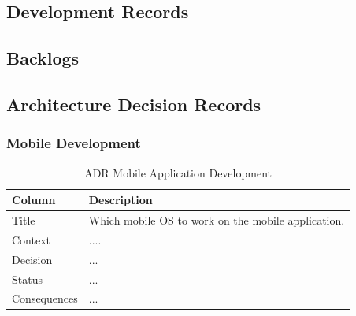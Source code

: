 \documentclass[12pt,a4paper]{article}
\begin{document}
    \begin{appendices}                  
      \section{Development Records}
        \subsection{Backlogs}\label{appendix:backlogs}
          
          
        \subsection{Architecture Decision Records}\label{appendix:Architecture Decision Records}
          \subsubsection{Mobile Development}
            \begin{table}[H]
              \centering
                \begin{tabularx}{\textwidth}{l X}
                  \hline
                  Column & Description  \\ \hline
                  Title & Which mobile OS to work on the mobile application. \\ 
                  Context & ....  \\ 
                  Decision & ...  \\ 
                  Status & ... \\ 
                  Consequences & ... \\                  
                  \hline
                \end{tabularx}
                \caption[Table caption text]{ADR Mobile Application Development}
                \label{table:ADR Mobile Application Development}
            \end{table}


\end{appendices}
\end{document}
